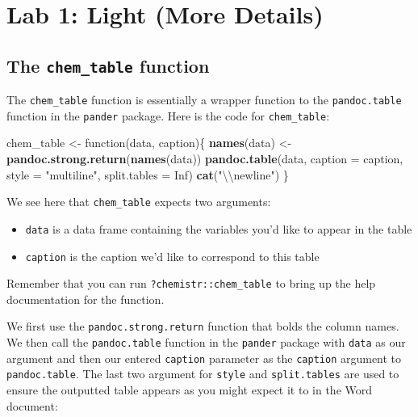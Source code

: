 \documentclass[]{tufte-book}
\newenvironment{Shaded}{\begin{snugshade}}{\end{snugshade}}
\newcommand{\KeywordTok}[1]{\textcolor[rgb]{0.13,0.29,0.53}{\textbf{{#1}}}}
\newcommand{\DataTypeTok}[1]{\textcolor[rgb]{0.13,0.29,0.53}{{#1}}}
\newcommand{\CharTok}[1]{\textcolor[rgb]{0.31,0.60,0.02}{{#1}}}
\newcommand{\StringTok}[1]{\textcolor[rgb]{0.31,0.60,0.02}{{#1}}}
\newcommand{\OtherTok}[1]{\textcolor[rgb]{0.56,0.35,0.01}{{#1}}}
\newcommand{\NormalTok}[1]{{#1}}
\providecommand{\tightlist}{%
  \setlength{\itemsep}{0pt}\setlength{\parskip}{0pt}}
\begin{document}
\chapter{Lab 1: Light (More Details)}\label{appendix-light}

\section{\texorpdfstring{The \texttt{chem\_table}
function}{The chem\_table function}}\label{the-chem_table-function}

The \texttt{chem\_table} function is essentially a wrapper function to
the \texttt{pandoc.table} function in the \texttt{pander} package. Here
is the code for \texttt{chem\_table}:

\begin{Shaded}
\begin{Highlighting}[]
\NormalTok{chem_table <-}\StringTok{ }\NormalTok{function(data, caption)\{}
  \KeywordTok{names}\NormalTok{(data) <-}\StringTok{ }\KeywordTok{pandoc.strong.return}\NormalTok{(}\KeywordTok{names}\NormalTok{(data))}
  \KeywordTok{pandoc.table}\NormalTok{(data, }\DataTypeTok{caption =} \NormalTok{caption, }\DataTypeTok{style =} \StringTok{"multiline"}\NormalTok{,}
               \DataTypeTok{split.tables =} \OtherTok{Inf}\NormalTok{)}
  \KeywordTok{cat}\NormalTok{(}\StringTok{"}\CharTok{\textbackslash{}\textbackslash{}}\StringTok{newline"}\NormalTok{)}
\NormalTok{\}}
\end{Highlighting}
\end{Shaded}

We see here that \texttt{chem\_table} expects two arguments:

\begin{itemize}
\tightlist
\item
  \texttt{data} is a data frame containing the variables you'd like to
  appear in the table
\item
  \texttt{caption} is the caption we'd like to correspond to this table
\end{itemize}

Remember that you can run \texttt{?chemistr::chem\_table} to bring up
the help documentation for the function.

We first use the \texttt{pandoc.strong.return} function that bolds the
column names. We then call the \texttt{pandoc.table} function in the
\texttt{pander} package with \texttt{data} as our argument and then our
entered \texttt{caption} parameter as the \texttt{caption} argument to
\texttt{pandoc.table}. The last two argument for \texttt{style} and
\texttt{split.tables} are used to ensure the outputted table appears as
you might expect it to in the Word document:
\end{document}
